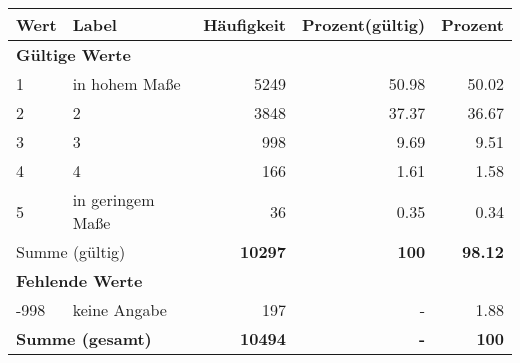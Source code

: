      \begin{longtable}{lXrrr}
     \toprule
     \textbf{Wert} & \textbf{Label} & \textbf{Häufigkeit} & \textbf{Prozent(gültig)} & \textbf{Prozent} \\
     \endhead
     \midrule
     \multicolumn{5}{l}{\textbf{Gültige Werte}}\\

     1 &
     \multicolumn{1}{X}{ in hohem Maße   } &


       \num{5249} &
       \num[round-mode=places,round-precision=2]{50,98} &
         \num[round-mode=places,round-precision=2]{50,02} \\

     2 &
     \multicolumn{1}{X}{ 2   } &


       \num{3848} &
       \num[round-mode=places,round-precision=2]{37,37} &
         \num[round-mode=places,round-precision=2]{36,67} \\

     3 &
     \multicolumn{1}{X}{ 3   } &


       \num{998} &
       \num[round-mode=places,round-precision=2]{9,69} &
         \num[round-mode=places,round-precision=2]{9,51} \\

     4 &
     \multicolumn{1}{X}{ 4   } &


       \num{166} &
       \num[round-mode=places,round-precision=2]{1,61} &
         \num[round-mode=places,round-precision=2]{1,58} \\

     5 &
     \multicolumn{1}{X}{ in geringem Maße   } &


       \num{36} &
       \num[round-mode=places,round-precision=2]{0,35} &
         \num[round-mode=places,round-precision=2]{0,34} \\
     \midrule
     \multicolumn{2}{l}{Summe (gültig)} &
       \textbf{\num{10297}} &
     \textbf{100} &
       \textbf{\num[round-mode=places,round-precision=2]{98,12}} \\
     \multicolumn{5}{l}{\textbf{Fehlende Werte}}\\
       -998 &
       keine Angabe &
         \num{197} &
        - &
         \num[round-mode=places,round-precision=2]{1,88} \\
     \midrule
     \multicolumn{2}{l}{\textbf{Summe (gesamt)}} &
          \textbf{\num{10494}} &
        \textbf{-} &
        \textbf{100} \\
     \bottomrule
     \end{longtable}
     
